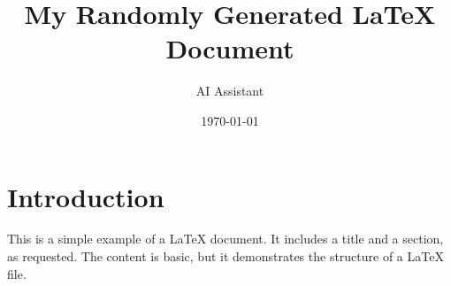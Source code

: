 \documentclass{article}
\title{My Randomly Generated LaTeX Document}
\author{AI Assistant}
\date{\today}
\begin{document}
\maketitle

\section{Introduction}
This is a simple example of a LaTeX document. It includes a title and a section, as requested. The content is basic, but it demonstrates the structure of a LaTeX file.
\end{document}
